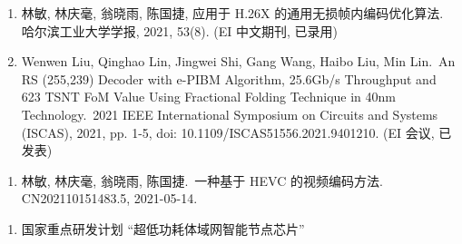 \begin{publications}
    \begin{enumerate}
        \item 林敏, 林庆毫, 翁晓雨, 陈国捷,
              应用于 H.26X 的通用无损帧内编码优化算法.\,
              哈尔滨工业大学学报, 2021, 53(8). (EI 中文期刊, 已录用)

        \item Wenwen Liu, Qinghao Lin, Jingwei Shi, Gang Wang, Haibo Liu, Min Lin.\,
              An RS (255,239) Decoder with e-PIBM Algorithm, 25.6Gb/s Throughput and 623 TSNT FoM Value Using Fractional Folding Technique in 40nm Technology.\,
              2021 IEEE International Symposium on Circuits and Systems (ISCAS), 2021, pp. 1-5, doi: 10.1109/ISCAS51556.2021.9401210. (EI 会议, 已发表)
    \end{enumerate}

    \begin{enumerate}
        \item 林敏, 林庆毫, 翁晓雨, 陈国捷.\,
              一种基于 HEVC 的视频编码方法.\,
              CN202110151483.5, 2021-05-14.
    \end{enumerate}

    \begin{enumerate}
        \item 国家重点研发计划 “超低功耗体域网智能节点芯片”
    \end{enumerate}
\end{publications}